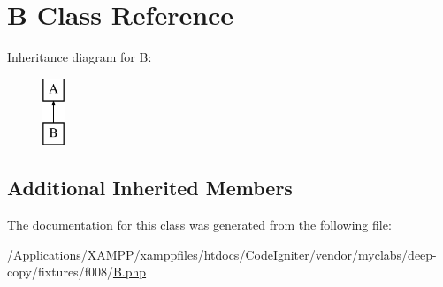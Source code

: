 \hypertarget{class_deep_copy_1_1f008_1_1_b}{}\section{B Class Reference}
\label{class_deep_copy_1_1f008_1_1_b}
Inheritance diagram for B\+:\begin{figure}[H]
\begin{center}
\leavevmode
\includegraphics[height=2.000000cm]{class_deep_copy_1_1f008_1_1_b}
\end{center}
\end{figure}
\subsection*{Additional Inherited Members}


The documentation for this class was generated from the following file\+:\begin{DoxyCompactItemize}
\item 
/\+Applications/\+X\+A\+M\+P\+P/xamppfiles/htdocs/\+Code\+Igniter/vendor/myclabs/deep-\/copy/fixtures/f008/\mbox{\hyperlink{f008_2_b_8php}{B.\+php}}\end{DoxyCompactItemize}
